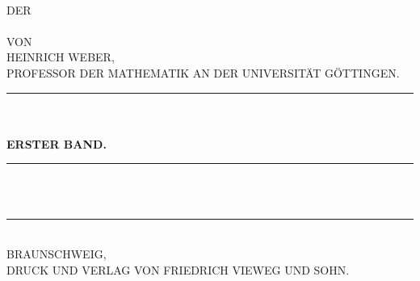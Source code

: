 \begin{center}
\vspace*{2cm}
{\LARGE {}}\\[1.5em]
{\small DER}\\[1.5em]
{\Huge {}}\\[2.5em]
{\small VON}\\[1.5em]
{\LARGE HEINRICH WEBER,}\\[0.4em]
{\footnotesize PROFESSOR DER MATHEMATIK AN DER UNIVERSITÄT GÖTTINGEN.}\\[2em]
\rule{3cm}{0.4pt}\\[3em]
{\large {}}\\[2em]
{\large \textbf{ERSTER BAND.}}\\[2em]
\rule{2.5cm}{0.4pt}\\[2.5em]
{\small {}}\\[3em]
\rule{\textwidth}{1pt}\\[1.5em]
{\large BRAUNSCHWEIG,}\\[0.5em]
{\small DRUCK UND VERLAG VON FRIEDRICH VIEWEG UND SOHN.}\\[0.5em]
{\large {}}
\end{center}
